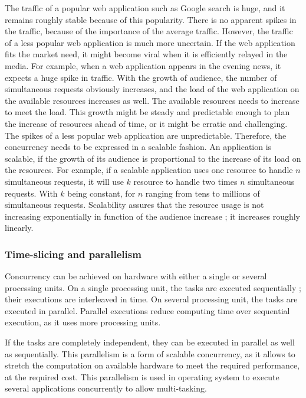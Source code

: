 The traffic of a popular web application such as Google search is huge, and it remains roughly stable because of this popularity.
There is no apparent spikes in the traffic, because of the importance of the average traffic.
However, the traffic of a less popular web application is much more uncertain.
If the web application fits the market need, it might become viral when it is efficiently relayed in the media.
For example, when a web application appears in the evening news, it expects a huge spike in traffic.
With the growth of audience, the number of simultaneous requests obviously  increases, and the load of the web application on the available resources increases  as well.
The available resources needs to increase to meet the load.
This growth might be steady and predictable enough to plan the increase of resources ahead of time, or it might be erratic and challenging.
The spikes of a less popular web application are unpredictable.
Therefore, the concurrency needs to be expressed in a scalable fashion.
An application is scalable, if the growth of its audience is proportional to the increase of its load on the resources.
For example, if a scalable application uses one resource to handle $n$ simultaneous requests, it will use $k$ resource to handle two times $n$ simultaneous requests.
With $k$ being constant, for $n$ ranging from tens to millions of simultaneous requests.
Scalability assures that the resource usage is not increasing exponentially in function of the audience increase ; it increases roughly linearly.


\subsubsection{Time-slicing and parallelism}

Concurrency can be achieved on hardware with either a single or several processing units.
On a single processing unit, the tasks are executed sequentially ; their executions are interleaved in time.
On several processing unit, the tasks are executed in parallel.
Parallel executions reduce computing time over sequential execution, as it uses more processing units.

If the tasks are completely independent, they can be executed in parallel as well as sequentially.
This parallelism is a form of scalable concurrency, as it allows to stretch the computation on available hardware to meet the required performance, at the required cost.
This parallelism is used in operating system to execute several applications concurrently to allow multi-tasking.

